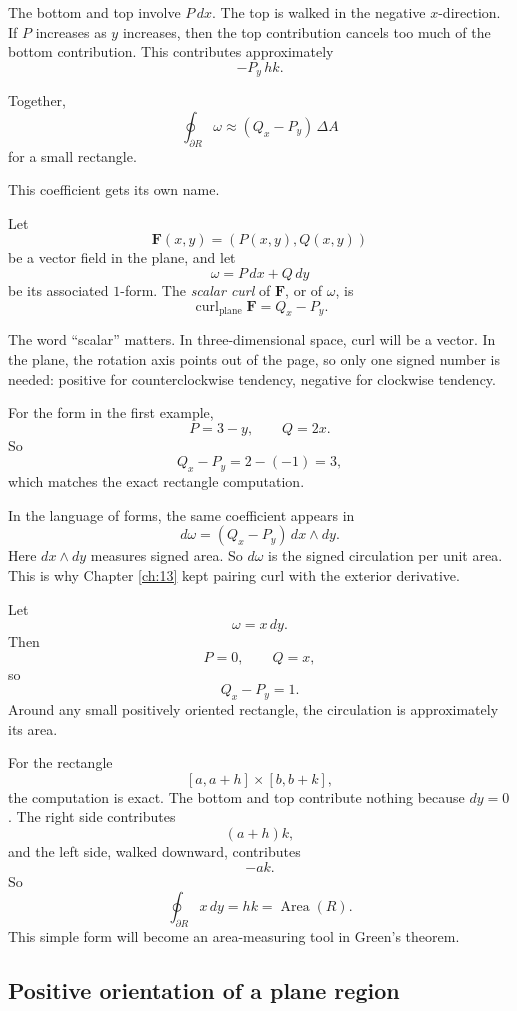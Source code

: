 The bottom and top involve \(P\,dx\).  The top is walked in the negative \(x\)-direction.
If \(P\) increases as \(y\) increases, then the top contribution cancels too much of the
bottom contribution.  This contributes approximately
\[
    -P_y\,hk.
\]

Together,
\[
\boxed{
    \oint_{\partial R}\omega
    \approx
    (Q_x-P_y)\,\Delta A
}
\]
for a small rectangle.

This coefficient gets its own name.

\begin{definition}
Let
\[
    \mathbf F(x,y)=(P(x,y),Q(x,y))
\]
be a vector field in the plane, and let
\[
    \omega=P\,dx+Q\,dy
\]
be its associated \(1\)-form.  The \emph{scalar curl} of \(\mathbf F\), or of \(\omega\), is
\[
\boxed{
    \operatorname{curl}_{\mathrm{plane}}\mathbf F
    =
    Q_x-P_y.
}
\]
\end{definition}

The word ``scalar'' matters.  In three-dimensional space, curl will be a vector.  In the
plane, the rotation axis points out of the page, so only one signed number is needed:
positive for counterclockwise tendency, negative for clockwise tendency.

For the form in the first example,
\[
    P=3-y,
    \qquad
    Q=2x.
\]
So
\[
    Q_x-P_y=2-(-1)=3,
\]
which matches the exact rectangle computation.

In the language of forms, the same coefficient appears in
\[
\boxed{
    d\omega=(Q_x-P_y)\,dx\wedge dy.
}
\]
Here \(dx\wedge dy\) measures signed area.  So \(d\omega\) is the signed circulation
per unit area.  This is why Chapter \ref{ch:13} kept pairing curl with the exterior
derivative.

\begin{example}
Let
\[
    \omega=x\,dy.
\]
Then
\[
    P=0,
    \qquad
    Q=x,
\]
so
\[
    Q_x-P_y=1.
\]
Around any small positively oriented rectangle, the circulation is approximately its
area.

For the rectangle
\[
    [a,a+h]\times[b,b+k],
\]
the computation is exact.  The bottom and top contribute nothing because \(dy=0\).
The right side contributes
\[
    (a+h)k,
\]
and the left side, walked downward, contributes
\[
    -ak.
\]
So
\[
\boxed{
    \oint_{\partial R}x\,dy=hk=\operatorname{Area}(R).
}
\]
This simple form will become an area-measuring tool in Green's theorem.
\end{example}

\subsection{Positive orientation of a plane region}

